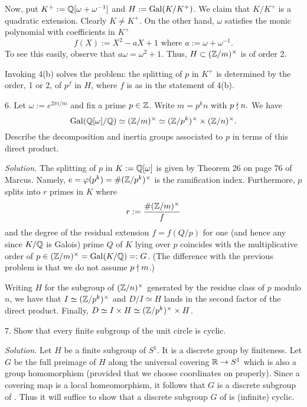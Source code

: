 \documentclass[10pt,a4paper,reqno]{amsart}
\begin{document}
Now, put $K^+ := \mathbb{Q}[\omega + \omega^{-1}]$ and $H := \mathrm{Gal}(K/K^+)$. We claim
that $K/K^+$ is a quadratic extension. Clearly $K\neq K^+$. On the other hand,
$\omega$ satisfies the monic polynomial with coefficients in $K^+$ \[f(X) :=
X^2-aX+1 \text{ where } a := \omega+\omega^{-1}.\] To see this easily,
observe that $a \omega = \omega^2 +1$. Thus, $H \subset (\mathbb{Z}/m)^\times$ is of
order 2.

Invoking 4(b) solves the problem: the splitting of $p$ in $K^+$ is determined
by the order, 1 or 2, of $p^f$ in $H$, where $f$ is as in the statement of
4(b).


\bigskip

6. Let $\omega := e^{2\pi i/m}$ and fix a prime $p\in \mathbb{Z}$. Write $m= p^kn$ with
$p\nmid n.$ We have \[\mathrm{Gal}(\mathbb{Q}[\omega]/\mathbb{Q}) \simeq (\mathbb{Z}/m)^\times \simeq
(\mathbb{Z}/p^k)^\times \times (\mathbb{Z}/n)^\times.\] Describe the decomposition and inertia
groups associated to $p$ in terms of this direct product.

\bigskip

\emph{Solution.} The splitting of $p$ in $K:= \mathbb{Q}[\omega]$ is given by Theorem
26 on page 76 of Marcus. Namely, $e = \varphi(p^k) = \# (\mathbb{Z}/p^k)^\times$ is the
ramification index. Furthermore, $p$ splits into $r$ primes in $K$ where \[r :=
\frac{\# (\mathbb{Z}/m)^\times}{f}\] and the degree of the residual extension $f =
f(Q/p)$ for one (and hence any since $K/\mathbb{Q}$ is Galois) prime $Q$ of $K$ lying
over $p$ coincides with the multiplicative order of $p \in (\mathbb{Z}/m)^\times =
\mathrm{Gal}(K/\mathbb{Q}) =: G$. (The difference with the previous problem is that we do not
assume $p\nmid m$.)

Writing $H$ for the subgroup of $(\mathbb{Z}/n)^\times$ generated by the residue class
of $p$ modulo $n$, we have that $I \simeq (\mathbb{Z}/p^k)^\times$ and $D/I \simeq H$
lands in the second factor of the direct product. Finally, $D \simeq I \times H
\simeq (\mathbb{Z}/p^k)^\times \times H$.

\bigskip

7. Show that every finite subgroup of the unit circle is cyclic.

\bigskip

\emph{Solution.} Let $H$ be a finite subgroup of $S^1$. It is a discrete group
by finiteness. Let $G$ be the full preimage of $H$ along the universal covering
$\mathbb{R} \rightarrow S^1$ which is also a group homomorphism (provided that we
choose coordinates on \R{} properly). Since a covering map is a local
homeomorphism, it follows that $G$ is a discrete subgroup of \R{}. Thus it will
suffice to show that a discrete subgroup $G$ of \R{} is (infinite) cyclic.
\end{document}
